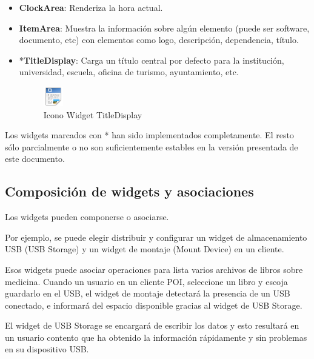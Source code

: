 \begin{itemize}
    \item{\textbf{ClockArea}: Renderiza la hora actual.}

    \item{\textbf{ItemArea}: Muestra la información sobre algún elemento (puede
    ser software, documento, etc) con elementos como logo, descripción,
    dependencia, título.}     

    \item{*\textbf{TitleDisplay}: Carga un título central por defecto para la
    institución, universidad, escuela, oficina de turismo, ayuntamiento, etc.

    \begin{figure}[ht]
        \begin{center}
            \includegraphics[height=32px]{src/img/widgets/titledisplay.png}
            \caption[Icono LogoArea] {Icono Widget TitleDisplay}
        \end{center}
    \end{figure}}

\end{itemize}

\newpage

Los widgets marcados con * han sido implementados completamente. El resto sólo
parcialmente o no son suficientemente estables en la versión presentada de este
documento.

\subsection{Composición de widgets y asociaciones}

Los widgets pueden componerse o asociarse.

Por ejemplo, se puede elegir distribuir y configurar un widget de almacenamiento
\acs{USB}\label{acro:USB} (USB Storage) y un widget de montaje (Mount Device) en
un cliente.

Esos widgets puede asociar operaciones para lista varios archivos de libros
sobre medicina. Cuando un usuario en un cliente POI, seleccione un libro y
escoja guardarlo en el USB, el widget de montaje detectará la presencia de un
USB conectado, e informará del espacio disponible gracias al widget de USB
Storage.

El widget de USB Storage se encargará de escribir los datos y esto
resultará en un usuario contento que ha obtenido la información rápidamente y
sin problemas en su dispositivo USB.

